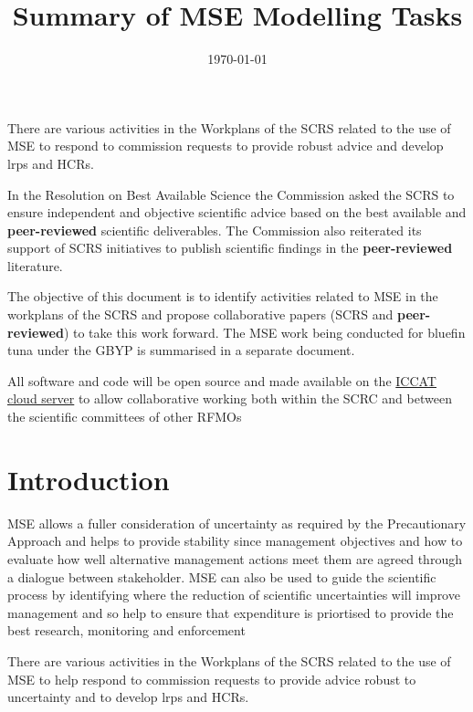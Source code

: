 \documentclass[a4paper,10pt]{article}
\title{Summary of MSE Modelling Tasks}
\author{} %
\date{\today}
\begin{document}
\maketitle

There are various activities in the Workplans of the \gls{SCRS} related to the use of
\gls{MSE} to respond to commission requests to provide robust advice and  develop
\glspl{lrp} and \glspl{HCR}.

In the Resolution on Best Available Science the Commission asked the \gls{SCRS} to
ensure independent and objective scientific advice based on the best available and \textbf{peer-reviewed} 
scientific deliverables. The Commission also reiterated its support of SCRS initiatives 
to publish scientific findings in the \textbf{peer-reviewed} literature.

The objective of this document is to identify activities related to MSE in the workplans of the SCRS  
and propose collaborative papers (SCRS and \textbf{peer-reviewed}) to take this work forward. 
The MSE work being conducted for bluefin tuna under the GBYP is summarised in a separate document.

All software and code will be open source and made available on the \href{http://rscloud.iccat.int}{ICCAT cloud server} to 
allow collaborative working both within the SCRC and between the scientific committees of other \glspl{RFMO}


\newpage\tableofcontents

\clearpage\newpage
\section{Introduction}

MSE allows a fuller consideration of uncertainty as required by the Precautionary Approach 
and helps to provide stability since management objectives and how to evaluate how well alternative management actions meet 
them are agreed through a dialogue between stakeholder. MSE can also be used to guide the scientific process by identifying where the
reduction of scientific uncertainties will improve management and so help to ensure that expenditure is priortised to provide the best research,
monitoring and enforcement 

There are various activities in the Workplans of the SCRS related to the use of
\gls{MSE} to help respond to commission requests to provide advice robust to uncertainty and to develop
\glspl{lrp} and \glspl{HCR}.
\end{document}
